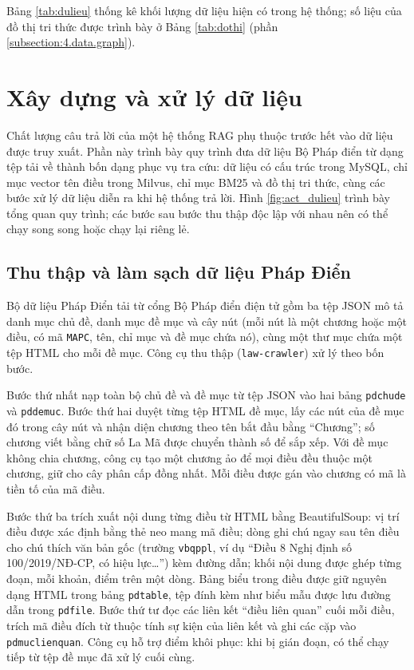 \documentclass[../DoAn.tex]{subfiles}
\begin{document}

Bảng \ref{tab:dulieu} thống kê khối lượng dữ liệu hiện có trong hệ thống; số liệu của đồ thị tri thức được trình bày ở Bảng \ref{tab:dothi} (phần \ref{subsection:4.data.graph}).



\section{Xây dựng và xử lý dữ liệu}
\label{section:4.data}
Chất lượng câu trả lời của một hệ thống RAG phụ thuộc trước hết vào dữ liệu được truy xuất. Phần này trình bày quy trình đưa dữ liệu Bộ Pháp điển từ dạng tệp tải về thành bốn dạng phục vụ tra cứu: dữ liệu có cấu trúc trong MySQL, chỉ mục vector tên điều trong Milvus, chỉ mục BM25 và đồ thị tri thức, cùng các bước xử lý dữ liệu diễn ra khi hệ thống trả lời. Hình \ref{fig:act_dulieu} trình bày tổng quan quy trình; các bước sau bước thu thập độc lập với nhau nên có thể chạy song song hoặc chạy lại riêng lẻ.


\subsection{Thu thập và làm sạch dữ liệu Pháp Điển}
Bộ dữ liệu Pháp Điển tải từ cổng Bộ Pháp điển điện tử \cite{phapdienportal} gồm ba tệp JSON mô tả danh mục chủ đề, danh mục đề mục và cây nút (mỗi nút là một chương hoặc một điều, có mã \texttt{MAPC}, tên, chỉ mục và đề mục chứa nó), cùng một thư mục chứa một tệp HTML cho mỗi đề mục. Công cụ thu thập (\texttt{law-crawler}) xử lý theo bốn bước.

Bước thứ nhất nạp toàn bộ chủ đề và đề mục từ tệp JSON vào hai bảng \texttt{pdchude} và \texttt{pddemuc}. Bước thứ hai duyệt từng tệp HTML đề mục, lấy các nút của đề mục đó trong cây nút và nhận diện chương theo tên bắt đầu bằng ``Chương''; số chương viết bằng chữ số La Mã được chuyển thành số để sắp xếp. Với đề mục không chia chương, công cụ tạo một chương ảo để mọi điều đều thuộc một chương, giữ cho cây phân cấp đồng nhất. Mỗi điều được gán vào chương có mã là tiền tố của mã điều.

Bước thứ ba trích xuất nội dung từng điều từ HTML bằng BeautifulSoup: vị trí điều được xác định bằng thẻ neo mang mã điều; dòng ghi chú ngay sau tên điều cho chú thích văn bản gốc (trường \texttt{vbqppl}, ví dụ ``Điều 8 Nghị định số 100/2019/NĐ-CP, có hiệu lực\ldots'') kèm đường dẫn; khối nội dung được ghép từng đoạn, mỗi khoản, điểm trên một dòng. Bảng biểu trong điều được giữ nguyên dạng HTML trong bảng \texttt{pdtable}, tệp đính kèm như biểu mẫu được lưu đường dẫn trong \texttt{pdfile}. Bước thứ tư đọc các liên kết ``điều liên quan'' cuối mỗi điều, trích mã điều đích từ thuộc tính sự kiện của liên kết và ghi các cặp vào \texttt{pdmuclienquan}. Công cụ hỗ trợ điểm khôi phục: khi bị gián đoạn, có thể chạy tiếp từ tệp đề mục đã xử lý cuối cùng.
\end{document}
